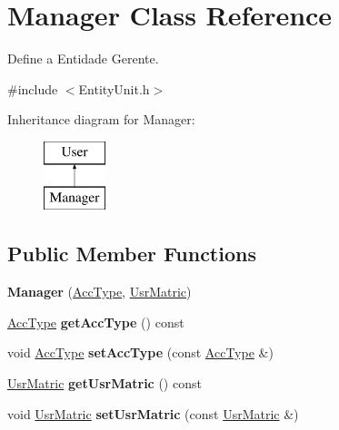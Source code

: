 \hypertarget{classManager}{\section{Manager Class Reference}
\label{classManager}
}


Define a Entidade Gerente.  




{\ttfamily \#include $<$Entity\-Unit.\-h$>$}

Inheritance diagram for Manager\-:\begin{figure}[H]
\begin{center}
\leavevmode
\includegraphics[height=2.000000cm]{classManager}
\end{center}
\end{figure}
\subsection*{Public Member Functions}
\begin{DoxyCompactItemize}
\item 
\hypertarget{classManager_aae6b4766b4b1798a55a51a31840d1f3a}{{\bfseries Manager} (\hyperlink{classUsrType}{Acc\-Type}, \hyperlink{classUsrMatric}{Usr\-Matric})}\label{classManager_aae6b4766b4b1798a55a51a31840d1f3a}

\item 
\hypertarget{classManager_ad1e303a73393545ead6237a5ef071132}{\hyperlink{classUsrType}{Acc\-Type} {\bfseries get\-Acc\-Type} () const }\label{classManager_ad1e303a73393545ead6237a5ef071132}

\item 
\hypertarget{classManager_ae60bf2d95d92a6b56f6b5cecd7ebb174}{void \hyperlink{classUsrType}{Acc\-Type} {\bfseries set\-Acc\-Type} (const \hyperlink{classUsrType}{Acc\-Type} \&)}\label{classManager_ae60bf2d95d92a6b56f6b5cecd7ebb174}

\item 
\hypertarget{classManager_a462f3704b016b57e087db417df73f07a}{\hyperlink{classUsrMatric}{Usr\-Matric} {\bfseries get\-Usr\-Matric} () const }\label{classManager_a462f3704b016b57e087db417df73f07a}

\item 
\hypertarget{classManager_a93309a0dde84dd0b5fe90d9e1da49822}{void \hyperlink{classUsrMatric}{Usr\-Matric} {\bfseries set\-Usr\-Matric} (const \hyperlink{classUsrMatric}{Usr\-Matric} \&)}\label{classManager_a93309a0dde84dd0b5fe90d9e1da49822}

\end{DoxyCompactItemize}



